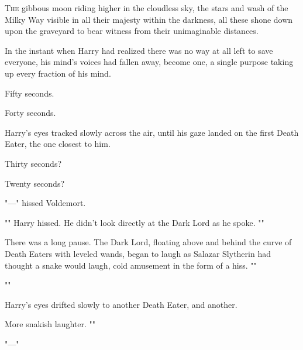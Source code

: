 
\lettrine{T}{he} gibbous moon
riding higher in the cloudless sky, the stars and wash of the Milky Way visible
in all their majesty within the darkness, all these shone down upon the
graveyard to bear witness from their unimaginable distances.

In the instant when Harry had realized there was no way at all left to save
everyone, his mind's voices had fallen away, become one, a single purpose
taking up every fraction of his mind.

Fifty seconds.

Forty seconds.

Harry's eyes tracked slowly across the air, until his gaze landed on the first
Death Eater, the one closest to him.

Thirty seconds?

Twenty seconds?

"---" hissed Voldemort.

"" Harry hissed. He didn't
look directly at the Dark Lord as he spoke. ""

There was a long pause. The Dark Lord, floating above and behind the curve of
Death Eaters with leveled wands, began to laugh as Salazar Slytherin had
thought a snake would laugh, cold amusement in the form of a hiss. ""

""

Harry's eyes drifted slowly to another Death Eater, and another.

More snakish laughter. ""

"---"

